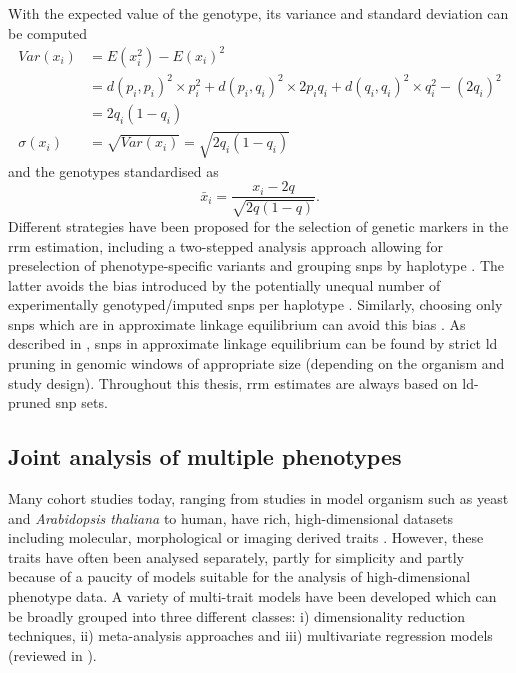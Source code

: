 %
With the expected value of the genotype, its variance and standard deviation can be computed
\begin{align}
Var(x_i) &= E(x_i^2) - E(x_i)^2 \\
&= d(p_i,p_i)^2 \times  p_i^2 + d(p_i,q_i)^2  \times 2p_iq_i + d(q_i,q_i)^2  \times q_i^2 - (2q_i)^2 \\
&=  2q_i(1-q_i) \\
\sigma(x_i) &= \sqrt{Var(x_i)} = \sqrt{2q_i(1-q_i)}
\end{align}
%
and the genotypes standardised as
\begin{equation}
\bar{x}_i = \frac{x_i - 2q}{\sqrt{2q(1-q)}}.
\end{equation}
%
Different strategies have been proposed for the selection of genetic markers in the \gls{rrm} estimation, including a two-stepped analysis approach allowing for preselection of phenotype-specific variants \citep{Lippert2013} and grouping \glspl{snp} by haplotype \citep{Zhao2007,Kang2008}. The latter avoids the bias introduced by the potentially unequal number of experimentally genotyped/imputed \glspl{snp} per haplotype \citep{Speed2017}. Similarly, choosing only \glspl{snp} which are in approximate linkage equilibrium can avoid this bias \citep{Browning2008}. As described in \citep{Eu-ahsunthornwattana2014}, \glspl{snp} in approximate linkage equilibrium can be found by strict \gls{ld} pruning in genomic windows of appropriate size (depending on the organism and study design). Throughout this thesis, \gls{rrm} estimates are always based on \gls{ld}-pruned \gls{snp} sets.  

\subsection{Joint analysis of multiple phenotypes}
\label{subsection:joint-analysis}
Many cohort studies today, ranging from studies in model organism such as yeast and \textit{Arabidopsis thaliana} to human, have rich, high-dimensional datasets including molecular, morphological or imaging derived traits \citep{Bloom2013,Atwell2010,Astle2009,Shaffer2016,Stein2010}. However, these traits have often been analysed separately,  partly for simplicity and partly because of a paucity of models suitable for the analysis of high-dimensional phenotype data. A variety of multi-trait models have been developed which can be broadly grouped into three different classes: i) dimensionality reduction techniques, ii) meta-analysis approaches and iii) multivariate regression models (reviewed in \citep{Shriner2012,Yang2012}). 

